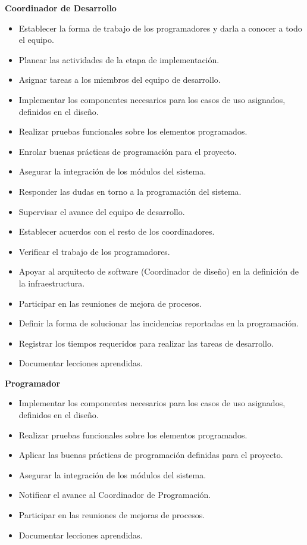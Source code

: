 \documentclass[10pt]{article}
\begin{document}
\textbf{Coordinador de Desarrollo}
\begin{itemize}
 \item Establecer la forma de trabajo de los programadores y darla a conocer a todo el equipo.
 \item Planear las actividades de la etapa de implementación.
 \item Asignar tareas a los miembros del equipo de desarrollo.
 \item Implementar los componentes necesarios para los casos de uso asignados, definidos en el diseño.
 \item Realizar pruebas funcionales sobre los elementos programados.
 \item Enrolar buenas prácticas de programación para el proyecto.
 \item Asegurar la integración de los módulos del sistema.
 \item Responder las dudas en torno a la programación del sistema.
 \item Supervisar el avance del equipo de desarrollo.
 \item Establecer acuerdos con el resto de los coordinadores.
 \item Verificar el trabajo de los programadores.
 \item Apoyar al arquitecto de software (Coordinador de diseño) en la definición de la infraestructura.
 \item Participar en las reuniones de mejora de procesos.
 \item Definir la forma de solucionar las incidencias reportadas en la programación.
 \item Registrar los tiempos requeridos para realizar las tareas de desarrollo.
 \item Documentar lecciones aprendidas.\\
\end{itemize}
\newpage 
\textbf{Programador}
\begin{itemize}
 \item Implementar los componentes necesarios para los casos de uso asignados, definidos en el diseño.
 \item Realizar pruebas funcionales sobre los elementos programados.
 \item Aplicar las buenas prácticas de programación definidas para el proyecto.
 \item Asegurar la integración de los módulos del sistema.
 \item Notificar el avance al Coordinador de Programación.
 \item Participar en las reuniones de mejoras de procesos.
 \item Documentar lecciones aprendidas.\\
\end{itemize}
\end{document}

